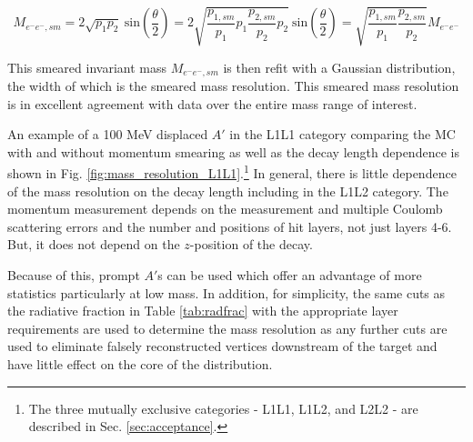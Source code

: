 \begin{equation}
    M_{e^-e^-,sm} = 2 \sqrt{p_{1}p_{2}} \ \mathrm{sin} \left( \frac{\theta}{2} \right) = 2 \sqrt{\frac{p_{1,sm}}{p_{1}} p_{1} \frac{p_{2,sm}}{p_{2}} p_{2} }  \ \mathrm{sin} \left( \frac{\theta}{2} \right) = \sqrt{\frac{p_{1,sm}}{p_{1}} \frac{p_{2,sm}}{p_{2} }} M_{e^-e^-}
    \label{equ:mass_res_smear}
\end{equation}

This smeared invariant mass $M_{e^-e^-,sm}$ is then refit with a Gaussian distribution, the width of which is the smeared mass resolution. This smeared mass resolution is in excellent agreement with data over the entire mass range of interest.

An example of a 100 MeV displaced $A'$ in the L1L1 category comparing the MC with and without momentum smearing as well as the decay length dependence is shown in Fig. \ref{fig:mass_resolution_L1L1}.\footnote{The three mutually exclusive categories - L1L1, L1L2, and L2L2 - are described in Sec. \ref{sec:acceptance}.} %
In general, there is little dependence of the mass resolution on the decay length including in the L1L2 category. The momentum measurement depends on the measurement and multiple Coulomb scattering errors and the number and positions of hit layers, not just layers 4-6. But, it does not depend on the $z$-position of the decay.


Because of this, prompt $A'$s can be used which offer an advantage of more statistics particularly at low mass. In addition, for simplicity, the same cuts as the radiative fraction in Table \ref{tab:radfrac} with the appropriate layer requirements are used to determine the mass resolution as any further cuts are used to eliminate falsely reconstructed vertices downstream of the target and have little effect on the core of the distribution.

